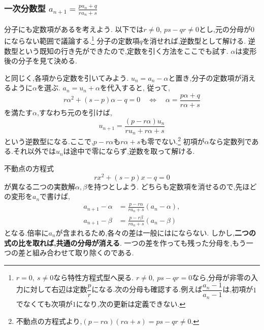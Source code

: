 
\subsubsection{\texorpdfstring{一次分数型   $\displaystyle a_{n+1}=\frac{pa_n+q}{ra_n+s}$}{一次分数型}}\label{節：一次分数型}
分子にも定数項があるを考えよう.
以下では$r\ne0$, $ps-qr\ne0$とし,元の分母が$0$にならない範囲で議論する.\footnote{$r=0,\ s\ne0$なら特性方程式型へ戻る.
  $r\ne0,\ ps-qr=0$なら,分母が非零の入力に対して右辺は定数$\dfrac{p}{r}$になる.次の分母も確認する.例えば$\dfrac{a_n-1}{a_n-1}$は,初項が$1$でなくても次項が$1$になり,次の更新は定義できない.}
分子の定数項$q$を消せれば,逆数型として解ける.
逆数型という既知の行き先ができたので,定数を引く方法をここでも試す.
$\alpha$は変形後の分子を見て決める.

と同じく,各項から定数を引いてみよう.
$u_n=a_n-\alpha$と置き,分子の定数項が消えるように$\alpha$を選ぶ.
$a_n=u_n+\alpha$を代入すると,
従って,
\[
  r\alpha^2+(s-p)\alpha-q=0
  \quad\Longleftrightarrow\quad
  \alpha=\frac{p\alpha+q}{r\alpha+s}
\]
を満たす$\alpha$,すなわち元のを引けば,
\[
  u_{n+1}=\frac{(p-r\alpha)u_n}{ru_n+r\alpha+s}
\]
という逆数型になる.ここで,$p-r\alpha$も$r\alpha+s$も零でない.\footnote{不動点の方程式より,$(p-r\alpha)(r\alpha+s)=ps-qr\ne0$.}
初項が$\alpha$なら定数列である.それ以外では$u_n$は途中で零にならず,逆数を取って解ける.

不動点の方程式
\[
  rx^2+(s-p)x-q=0
\]
が異なる二つの実数解$\alpha,\beta$を持つとしよう.
どちらも定数項を消せるので,先ほどの変形を$a_n$で書けば,
\begin{align*}
  a_{n+1}-\alpha
  &=\frac{p-r\alpha}{ra_n+s}(a_n-\alpha),\\
  a_{n+1}-\beta
  &=\frac{p-r\beta}{ra_n+s}(a_n-\beta)
\end{align*}
となる.倍率に$a_n$が含まれるため,各々の差は一般にはにならない.
しかし,\textbf{二つの式の比を取れば,共通の分母が消える}.
一つの差を作っても残った分母を,もう一つの差と組み合わせて取り除くのである.

